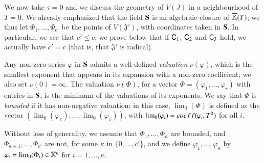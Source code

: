 \documentclass[amsthm]{elsart}
\begin{document}
We now take $\tau=0$ and we discuss the geometry of $V(J)$ in a
neighbourhood of $T=0$.  We already emphasized that the field $\SS$ is an
algebraic closure of $\KKbar(T)$; we thus let $\Phi_1,\dots,\Phi_{c'}$
be the points of $V(\mathfrak{J}')$, with coordinates taken in
$\SS$. In particular, we see that $c' \le c$; we prove below that if
$\assG_1$, $\assG_2$ and $\assG_3$ hold, we actually have $c'=c$ (that
is, that $\mathfrak{J}'$ is radical).

Any non-zero series $\varphi$ in $\SS$ admits a well-defined {\em
  valuation} $\nu(\varphi)$, which is the smallest exponent that
appears in its expansion with a non-zero coefficient; we also set
$\nu(0)=\infty$. The valuation $\nu(\Phi)$, for a vector
$\Phi=(\varphi_1,\dots,\varphi_r)$ with entries in $\SS$, is the
minimum of the valuations of its exponents. We say that $\Phi$ is {\em
  bounded} if it has non-negative valuation; in this case,
$\lim_0(\Phi)$ is defined as the vector
$(\lim_0(\varphi_1),\dots,\lim_0(\varphi_s))$, with
$\lim_0(\varphi_i)={\rm coeff}(\varphi_i,T^0)$ for all $i$.

Without loss of generality, we assume that
$\Phi_1,\dots,\Phi_\kappa$ are bounded, and
$\Phi_{\kappa+1},\dots,\Phi_{c'}$ are not, for some $\kappa$ in
$\{0,\dots,c'\}$, and we define $\varphi_1,\dots,\varphi_\kappa$ by
$\varphi_i=\lim_0(\Phi_i)\in\KKbar{}^n$ for
$i=1,\dots,\kappa$.
\end{document}
